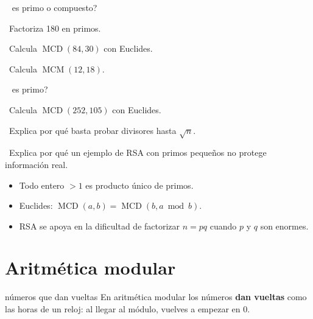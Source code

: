 \begin{tmejercicios}
\label{ej:2-4}
\begin{tmlista}
\item \tmbasico\  es primo o compuesto?
\item \tmbasico\ Factoriza 180 en primos.
\item \tmbasico\ Calcula $\operatorname{MCD}(84, 30)$ con Euclides.
\item \tmmedio\ Calcula $\operatorname{MCM}(12, 18)$.
\item \tmmedio\  es primo?
\item \tmmedio\ Calcula $\operatorname{MCD}(252, 105)$ con Euclides.
\item \tmdificil\ Explica por qu\'e basta probar divisores hasta $\sqrt n$.
\item \tmdificil\ Explica por qu\'e un ejemplo de RSA con primos peque\~nos no protege informaci\'on real.
\end{tmlista}
\end{tmejercicios}


\begin{tmresumen}
\begin{itemize}
\item Todo entero $>1$ es producto \'unico de primos.
\item Euclides: $\operatorname{MCD}(a, b)=\operatorname{MCD}(b, a\bmod b)$.
\item RSA se apoya en la dificultad de factorizar $n=pq$ cuando $p$ y $q$ son enormes.
\end{itemize}
\end{tmresumen}

\section{Aritm\'etica modular}
\label{sec:2-5}

\begin{tmconcepto}{n\'umeros que dan vueltas}
En aritm\'etica modular los n\'umeros \textbf{dan vueltas} como las horas de un reloj: al llegar al m\'odulo, vuelves a empezar en 0.
\end{tmconcepto}

